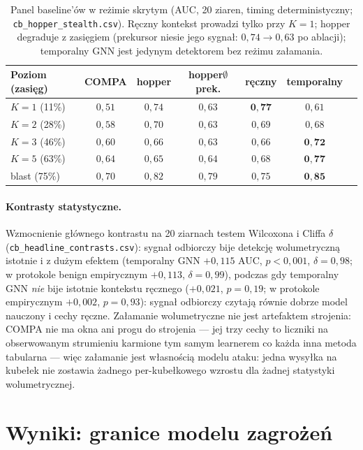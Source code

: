 \begin{table}[htbp]\centering\small
\begin{tabular}{lcccccc}
\toprule
Poziom (zasięg) & COMPA & hopper & hopper$\emptyset$prek. & ręczny & temporalny \\
\midrule
$K{=}1$ (11\%) & $0{,}51$ & $0{,}74$ & $0{,}63$ & $\mathbf{0{,}77}$ & $0{,}61$ \\
$K{=}2$ (28\%) & $0{,}58$ & $0{,}70$ & $0{,}63$ & $0{,}69$ & $0{,}68$ \\
$K{=}3$ (46\%) & $0{,}60$ & $0{,}66$ & $0{,}63$ & $0{,}66$ & $\mathbf{0{,}72}$ \\
$K{=}5$ (63\%) & $0{,}64$ & $0{,}65$ & $0{,}64$ & $0{,}68$ & $\mathbf{0{,}77}$ \\
blast (75\%)   & $0{,}70$ & $0{,}82$ & $0{,}79$ & $0{,}75$ & $\mathbf{0{,}85}$ \\
\bottomrule
\end{tabular}
\caption{Panel baseline'ów w reżimie skrytym (AUC, 20 ziaren,
timing deterministyczny; \texttt{cb\_hopper\_stealth.csv}). Ręczny
kontekst prowadzi tylko przy $K{=}1$; hopper degraduje z zasięgiem
(prekursor niesie jego sygnał: $0{,}74\to0{,}63$ po ablacji);
temporalny GNN jest jedynym detektorem bez reżimu załamania.}
\label{tab:k-baselines}
\end{table}

\paragraph{Kontrasty statystyczne.} Wzmocnienie głównego kontrastu
na 20 ziarnach testem Wilcoxona i Cliffa $\delta$
(\texttt{cb\_headline\_contrasts.csv}): sygnał odbiorczy bije detekcję
wolumetryczną istotnie i z dużym efektem (temporalny GNN
$+0{,}115$ AUC, $p<0{,}001$, $\delta=0{,}98$; w protokole benign
empirycznym $+0{,}113$, $\delta=0{,}99$), podczas gdy temporalny
GNN \emph{nie} bije istotnie kontekstu ręcznego ($+0{,}021$,
$p=0{,}19$; w protokole empirycznym $+0{,}002$, $p=0{,}93$):
sygnał odbiorczy czytają równie dobrze model nauczony i cechy
ręczne. Załamanie wolumetryczne nie jest artefaktem strojenia:
COMPA nie ma okna ani progu do strojenia --- jej trzy cechy to
liczniki na obserwowanym strumieniu karmione tym samym learnerem
co każda inna metoda tabularna --- więc załamanie jest własnością
modelu ataku: jedna wysyłka na kubełek nie zostawia żadnego
per-kubełkowego wzrostu dla żadnej statystyki wolumetrycznej.

\section{Wyniki: granice modelu zagrożeń}
\label{sec:k-granice}

